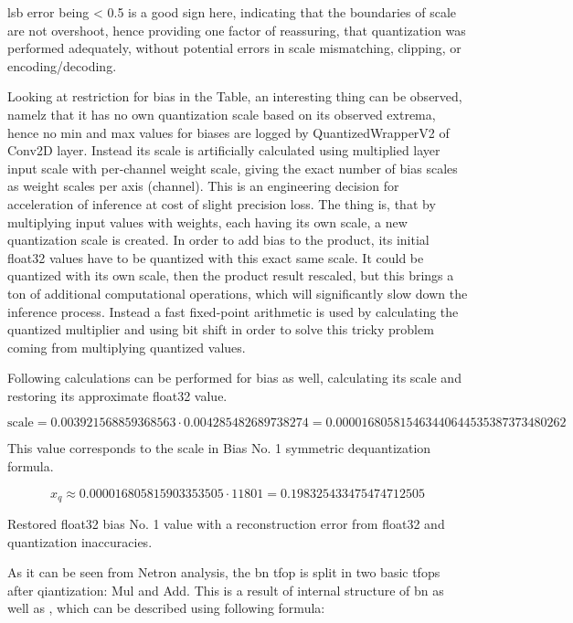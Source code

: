 {\gls{lsb} error being < 0.5 is a good sign here, indicating that the boundaries of scale are not overshoot,
hence providing one factor of reassuring, that quantization was performed adequately,
without potential errors in scale mismatching, clipping, or encoding/decoding.

Looking at restriction for bias in the Table, an interesting thing can be observed, namelz that it has no own quantization scale based on its observed extrema,
hence no min and max values for biases are logged by QuantizedWrapperV2 of Conv2D layer.
Instead its scale is artificially calculated using multiplied layer input scale with per-channel weight scale,
giving the exact number of bias scales as weight scales per axis (channel).
This is an engineering decision for acceleration of inference at cost of slight precision loss.
The thing is, that by multiplying input values with weights, each having its own scale, a new quantization scale is created.
In order to add bias to the product, its initial \gls{float32} values have to be quantized with this exact same scale.
It could be quantized with its own scale, then the product result rescaled,
but this brings a ton of additional computational operations, which will significantly slow down the inference process.
Instead a fast fixed-point arithmetic is used by calculating the quantized multiplier and using bit shift in order to solve
this tricky problem coming from multiplying quantized values.

Following calculations can be performed for bias as well, calculating its scale and restoring its approximate \gls{float32} value.

\begin{equation*}
\text{scale} = 0.003921568859368563 \cdot 0.004285482689738274 = 0.000016805815463440644535387373480262
\end{equation*}

This value corresponds to the scale in Bias No. 1 symmetric dequantization formula.

\begin{equation*}
x_{q} \approx 0.000016805815903353505 \cdot 11801 = 0.198325433475474712505
\end{equation*}

Restored \gls{float32} bias No. 1 value with a reconstruction error from \gls{float32} and quantization inaccuracies.

As it can be seen from Netron analysis, the \gls{bn} \gls{tfop} is split in two basic \glspl{tfop} after qiantization: Mul and Add.
This is a result of internal structure of \gls{bn} as well as , which can be described using following formula:

}
